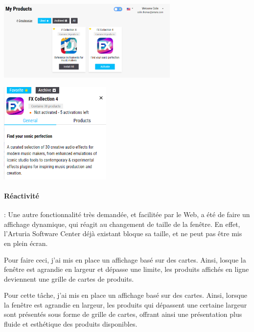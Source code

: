 \documentclass[francais]{rapportPFE}  %
\begin{document}
\begin{center}
    \centering
    \begin{minipage}{.5\textwidth}
    \centering
    \includegraphics[height=4cm]{graphics/favorite.png}
    \label{fig:test1}
    \end{minipage}%
    \begin{minipage}{.5\textwidth}
    \centering
    \includegraphics[height=5cm]{graphics/favorite_details.png}
    \label{fig:test2}
    \end{minipage}
    \end{center}

\paragraph{Réactivité}: Une autre fonctionnalité très demandée, et facilitée par le Web, a été de faire un affichage dynamique, qui réagit au changement de taille de la fenêtre. En effet, l'Arturia Software Center déjà existant bloque sa taille, et ne peut pas être mis en plein écran.

Pour faire ceci, j'ai mis en place un affichage basé sur des cartes. Ainsi, losque la fenêtre est agrandie en largeur et dépasse une limite, les produits affichés en ligne deviennent une grille de cartes de produits.

Pour cette tâche, j'ai mis en place un affichage basé sur des cartes. Ainsi, lorsque la fenêtre est agrandie en largeur, les produits qui dépassent une certaine largeur sont présentés sous forme de grille de cartes, offrant ainsi une présentation plus fluide et esthétique des produits disponibles.
\end{document}
